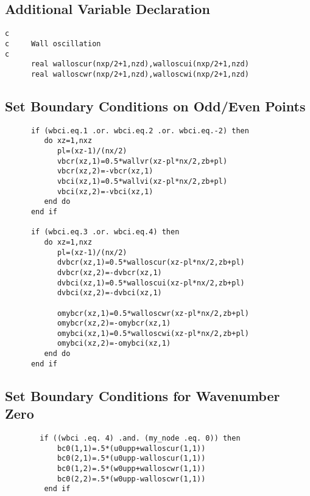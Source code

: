 \subsection*{Additional Variable Declaration}
\begin{verbatim}
c
c     Wall oscillation
c
      real walloscur(nxp/2+1,nzd),walloscui(nxp/2+1,nzd)
      real walloscwr(nxp/2+1,nzd),walloscwi(nxp/2+1,nzd)
\end{verbatim}

\subsection*{Set Boundary Conditions on Odd/Even Points}
\begin{verbatim}
      if (wbci.eq.1 .or. wbci.eq.2 .or. wbci.eq.-2) then
         do xz=1,nxz
            pl=(xz-1)/(nx/2)
            vbcr(xz,1)=0.5*wallvr(xz-pl*nx/2,zb+pl)
            vbcr(xz,2)=-vbcr(xz,1)
            vbci(xz,1)=0.5*wallvi(xz-pl*nx/2,zb+pl)
            vbci(xz,2)=-vbci(xz,1)
         end do
      end if

      if (wbci.eq.3 .or. wbci.eq.4) then
         do xz=1,nxz
            pl=(xz-1)/(nx/2)
            dvbcr(xz,1)=0.5*walloscur(xz-pl*nx/2,zb+pl) 
            dvbcr(xz,2)=-dvbcr(xz,1)
            dvbci(xz,1)=0.5*walloscui(xz-pl*nx/2,zb+pl)
            dvbci(xz,2)=-dvbci(xz,1)

            omybcr(xz,1)=0.5*walloscwr(xz-pl*nx/2,zb+pl)
            omybcr(xz,2)=-omybcr(xz,1)
            omybci(xz,1)=0.5*walloscwi(xz-pl*nx/2,zb+pl)
            omybci(xz,2)=-omybci(xz,1)
         end do
      end if
\end{verbatim}

\subsection*{Set Boundary Conditions for Wavenumber Zero}
\begin{verbatim}
        if ((wbci .eq. 4) .and. (my_node .eq. 0)) then
            bc0(1,1)=.5*(u0upp+walloscur(1,1))
            bc0(2,1)=.5*(u0upp-walloscur(1,1))
            bc0(1,2)=.5*(w0upp+walloscwr(1,1))
            bc0(2,2)=.5*(w0upp-walloscwr(1,1))
         end if
\end{verbatim}
